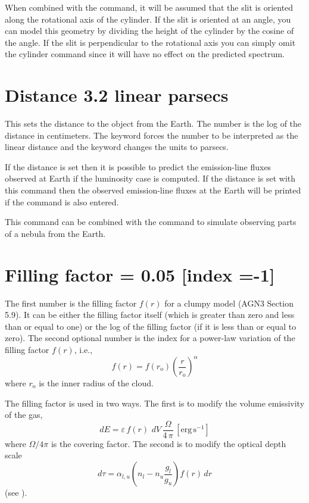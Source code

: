 When combined with the  command, it will be assumed
that the slit is oriented along the rotational axis of the cylinder. If the
slit is oriented at an angle, you can model this geometry by dividing the
height of the cylinder by the cosine of the angle. If the slit is
perpendicular to the rotational axis you can simply omit the cylinder command
since it will have no effect on the predicted spectrum.

\section{Distance 3.2 linear parsecs}

This sets the distance to the object from the Earth.
The number is the
log of the distance in centimeters.
The  keyword forces the number
to be interpreted as the linear distance and the
 keyword changes
the units to parsecs.

If the distance is set then it is possible to predict the emission-line
fluxes observed at Earth if the luminosity case is
computed.
If the distance is set with this command then the observed
emission-line fluxes at the Earth will be printed if the
command is also entered.

This command can be combined with the  command
to simulate observing parts of a nebula from the Earth.

\section{Filling factor = 0.05 [index =-1]}
\label{sec:CommandFillingFactor}

The first number is the filling factor $f(r)$ for a clumpy model (AGN3
Section 5.9).
It can be either the filling factor itself (which is greater
than zero and less than or equal to one) or the log of the filling factor
(if it is less than or equal to zero).
The second optional number is the
index  for a power-law variation of the filling factor $f(r)$, i.e.,
\begin{equation}
f\left( r \right) = f\left( {r_{\mathrm{o}} } \right)\left( {\frac{r}{{r_{\mathrm{o}}
}}} \right)^\alpha
\end{equation}
where $r_{\mathrm{o}}$ is the inner radius of the cloud.

The filling factor is used in two ways.  The first is to modify the volume
emissivity of the gas,
\begin{equation}
dE = \varepsilon \,f\left( r \right)\,\,dV\,\frac{\Omega }{{4\,\pi }}
\,[\mathrm{erg\, s}^{-1}]%
\end{equation}
where $\Omega/4\pi$ is the covering factor.
The second is to modify the optical depth scale
\begin{equation}
d\tau  = \alpha _{l,u} \left( {n_l  - n_u \frac{{g_l }}{{g_u }}}
\right)f\left( r \right)\,dr
\end{equation}
(see \citealp{Osterbrock1959}).

